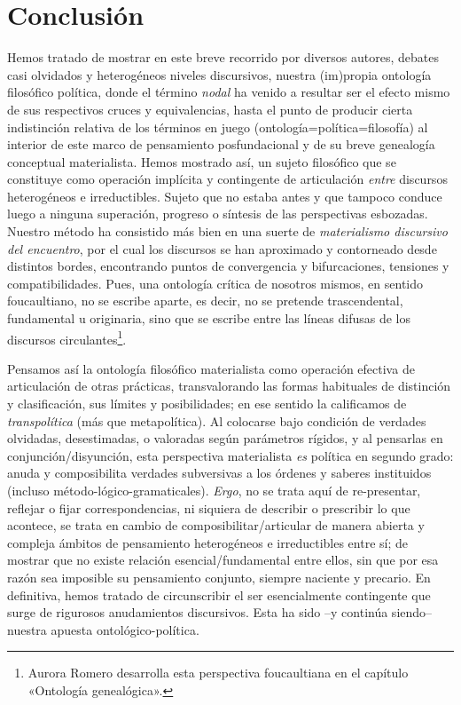 \section{Conclusión}

Hemos tratado de mostrar en este breve recorrido por diversos autores, debates casi olvidados y heterogéneos niveles discursivos, nuestra (im)propia ontología filosófico política, donde el término \emph{nodal} ha venido a resultar ser el efecto mismo de sus respectivos cruces y equivalencias, hasta el punto de producir cierta indistinción relativa de los términos en juego (ontología=política=filosofía) al interior de este marco de pensamiento posfundacional y de su breve genealogía conceptual materialista. Hemos mostrado así, un sujeto filosófico que se constituye como operación implícita y contingente de articulación \emph{entre} discursos heterogéneos e irreductibles. Sujeto que no estaba antes y que tampoco conduce luego a ninguna superación, progreso o síntesis de las perspectivas esbozadas. Nuestro método ha consistido más bien en una suerte de \emph{materialismo discursivo del encuentro}, por el cual los discursos se han aproximado y contorneado desde distintos bordes, encontrando puntos de convergencia y bifurcaciones, tensiones y compatibilidades. Pues, una ontología crítica de nosotros mismos, en sentido foucaultiano, no se escribe aparte, es decir, no se pretende trascendental, fundamental u originaria, sino que se escribe entre las líneas difusas de los discursos circulantes\footnote{Aurora Romero desarrolla esta perspectiva foucaultiana en el capítulo «Ontología genealógica».}.

Pensamos así la ontología filosófico materialista como operación efectiva de articulación de otras prácticas, transvalorando las formas habituales de distinción y clasificación, sus límites y posibilidades; en ese sentido la calificamos de \emph{transpolítica} (más que metapolítica). Al colocarse bajo condición de verdades olvidadas, desestimadas, o valoradas según parámetros rígidos, y al pensarlas en conjunción/disyunción, esta perspectiva materialista \emph{es} política en segundo grado: anuda y composibilita verdades subversivas a los órdenes y saberes instituidos (incluso método-lógico-gramaticales). \emph{Ergo}, no se trata aquí de re-presentar, reflejar o fijar correspondencias, ni siquiera de describir o prescribir lo que acontece, se trata en cambio de composibilitar/articular de manera abierta y compleja ámbitos de pensamiento heterogéneos e irreductibles entre sí; de mostrar que no existe relación esencial/fundamental entre ellos, sin que por esa razón sea imposible su pensamiento conjunto, siempre naciente y precario. En definitiva, hemos tratado de circunscribir el ser esencialmente contingente que surge de rigurosos anudamientos discursivos. Esta ha sido --y continúa siendo-- nuestra apuesta ontológico-política.

